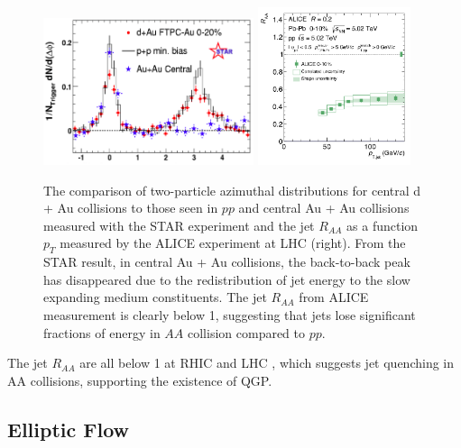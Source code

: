 \begin{figure}[hbtp]
\begin{center}
\includegraphics[width=0.55\textwidth]{Figures/Chapter1/HadronAngularSTAR.png}
\includegraphics[width=0.40\textwidth]{Figures/Chapter1/JetRAAALICE.png}
\caption{The comparison of two-particle azimuthal distributions for central d + Au collisions to those seen in $pp$ and central Au + Au collisions measured with the STAR experiment and the jet $R_{AA}$ as a function $p_T$ measured by the ALICE experiment at LHC (right). From the STAR result, in central Au + Au collisions, the back-to-back peak has disappeared due to the redistribution of jet energy to the slow expanding medium constituents. The jet $R_{AA}$ from ALICE measurement is clearly below 1, suggesting that jets lose significant fractions of energy in $AA$ collision compared to $pp$.}
\label{JetRAA}
\end{center}
\end{figure} 

The jet $R_{AA}$ are all below 1 at RHIC and LHC \cite{ALICEJetRef,CMSJetSub}, which suggests jet quenching in AA collisions, supporting the existence of QGP.

\subsection{Elliptic Flow} 

